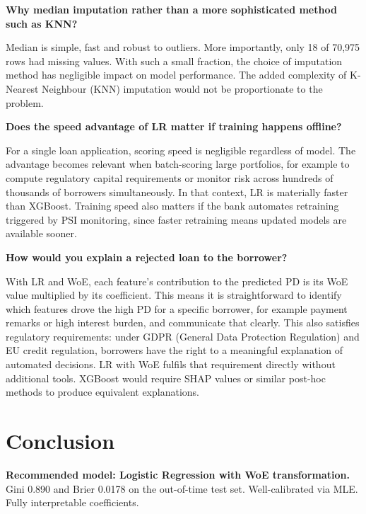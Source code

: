 \documentclass[a4paper,11pt]{article}
\begin{document}
\textbf{Why median imputation rather than a more sophisticated method such as KNN?}

Median is simple, fast and robust to outliers. More importantly, only 18 of 70{,}975
rows had missing values. With such a small fraction, the choice of imputation method
has negligible impact on model performance. The added complexity of K-Nearest Neighbour (KNN) imputation
would not be proportionate to the problem.

\textbf{Does the speed advantage of LR matter if training happens offline?}

For a single loan application, scoring speed is negligible regardless of model. The
advantage becomes relevant when batch-scoring large portfolios, for example to compute
regulatory capital requirements or monitor risk across hundreds of thousands of
borrowers simultaneously. In that context, LR is materially faster than XGBoost.
Training speed also matters if the bank automates retraining triggered by PSI
monitoring, since faster retraining means updated models are available sooner.

\textbf{How would you explain a rejected loan to the borrower?}

With LR and WoE, each feature's contribution to the predicted PD is its WoE value
multiplied by its coefficient. This means it is straightforward to identify which
features drove the high PD for a specific borrower, for example payment remarks or
high interest burden, and communicate that clearly. This also satisfies regulatory
requirements: under GDPR (General Data Protection Regulation) and EU credit regulation, borrowers have the right to a
meaningful explanation of automated decisions. LR with WoE fulfils that requirement
directly without additional tools. XGBoost would require SHAP values or similar
post-hoc methods to produce equivalent explanations.

\section{Conclusion}

\textbf{Recommended model: Logistic Regression with WoE transformation.}
Gini 0.890 and Brier 0.0178 on the out-of-time test set. Well-calibrated via MLE.
Fully interpretable coefficients.
\end{document}
